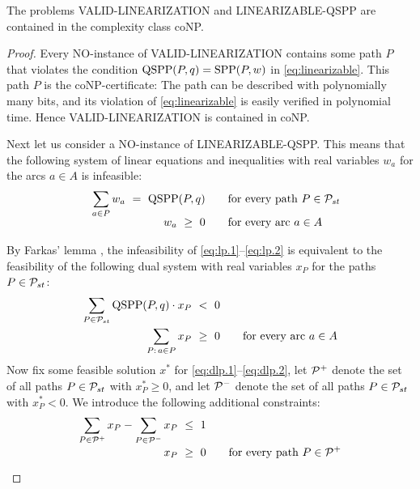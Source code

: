 \documentclass[runningheads]{llncs}
\begin{document}
\begin{lemma}
\label{le:coNP}
The problems VALID-LINEARIZATION and LINEARIZABLE-QSPP are contained in the complexity class coNP.
\end{lemma}
\begin{proof}
Every NO-instance of VALID-LINEARIZATION contains some path $P$ that violates the condition
$\text{QSPP}(P,q)=\text{SPP}(P,w)$ in \eqref{eq:linearizable}.
This path $P$ is the coNP-certificate: The path can be described with polynomially many bits,
and its violation of \eqref{eq:linearizable} is easily verified in polynomial time.
Hence VALID-LINEARIZATION is contained in coNP.

Next let us consider a NO-instance of LINEARIZABLE-QSPP.
This means that the following system of linear equations and inequalities with real 
variables $w_a$ for the arcs $a\in A$ is infeasible:
\begin{align}
\sum_{a\in P} w_a~=~\qspp(P,q) &\qquad\text{for every path $P\in\ppp$} \label{eq:lp.1} \\[-1.2ex]
              w_a~\ge~0        &\qquad\text{for every arc $a\in A$}    \label{eq:lp.2} \\[-2.5ex]
\hphantom{\sum_{P\in\ppp} \qspp(P,q)\cdot x_P~<~0} &&                  \nonumber
\end{align}
By Farkas' lemma \cite{Farkas1902}, the infeasibility of \eqref{eq:lp.1}--\eqref{eq:lp.2}
is equivalent to the feasibility of the following dual system with real variables $x_P$ for the
paths $P\in{\cal P}_{st}$:
\begin{align}
\sum_{P\in{\cal P}_{st}} \text{QSPP}(P,q)\cdot x_P ~<~0 &                                    \label{eq:dlp.1} \\[-0.2ex]
\sum_{P:\,a\in P} x_P             ~\ge~0 &\qquad\text{for every arc $a\in A$} \label{eq:dlp.2} 
\end{align}
Now fix some feasible solution $x^*$ for \eqref{eq:dlp.1}--\eqref{eq:dlp.2},
let ${\cal P}^+$ denote the set of all paths $P\in{\cal P}_{st}$ with $x^*_P\ge0$, and 
let ${\cal P}^-$ denote the set of all paths $P\in{\cal P}_{st}$ with $x^*_P<0$.
We introduce the following additional constraints:
\begin{align}
\sum_{P\in\pppx}x_P - \sum_{P\in\pppy}x_P  ~\le~1  &                 \label{eq:dlp.3} \\[-0.5ex]
                x_P  ~\ge~0 &\qquad\text{for every path $P\in\pppx$} \label{eq:dlp.4} \\[0.5ex]

\end{align}
\end{proof}
\end{document}
